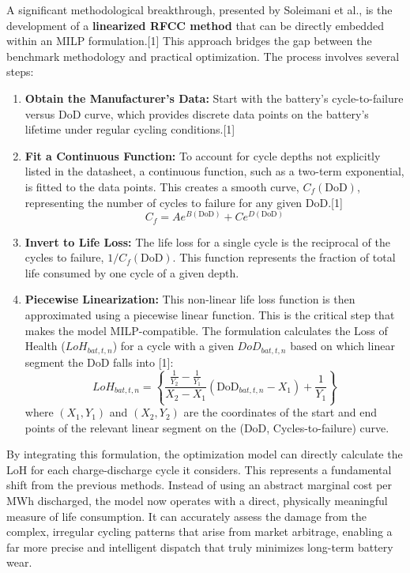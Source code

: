 A significant methodological breakthrough, presented by Soleimani et al., is the development of a \textbf{linearized RFCC method} that can be directly embedded within an MILP formulation.[1] This approach bridges the gap between the benchmark methodology and practical optimization. The process involves several steps:
\begin{enumerate}
    \item \textbf{Obtain the Manufacturer's Data:} Start with the battery's cycle-to-failure versus DoD curve, which provides discrete data points on the battery's lifetime under regular cycling conditions.[1]
    \item \textbf{Fit a Continuous Function:} To account for cycle depths not explicitly listed in the datasheet, a continuous function, such as a two-term exponential, is fitted to the data points. This creates a smooth curve, $C_f(\text{DoD})$, representing the number of cycles to failure for any given DoD.[1]
    \begin{equation}
    C_{f} = A e^{B(\text{DoD})} + C e^{D(\text{DoD})}
    \end{equation}
    \item \textbf{Invert to Life Loss:} The life loss for a single cycle is the reciprocal of the cycles to failure, $1/C_f(\text{DoD})$. This function represents the fraction of total life consumed by one cycle of a given depth.
    \item \textbf{Piecewise Linearization:} This non-linear life loss function is then approximated using a piecewise linear function. This is the critical step that makes the model MILP-compatible. The formulation calculates the Loss of Health ($LoH_{bat,t,n}$) for a cycle with a given $DoD_{bat,t,n}$ based on which linear segment the DoD falls into [1]:
    \begin{equation}
    LoH_{bat,t,n} = \left\{ \frac{\frac{1}{Y_2} - \frac{1}{Y_1}}{X_2 - X_1}(\text{DoD}_{bat,t,n} - X_1) + \frac{1}{Y_1} \right\}
    \end{equation}
    where $(X_1, Y_1)$ and $(X_2, Y_2)$ are the coordinates of the start and end points of the relevant linear segment on the (DoD, Cycles-to-failure) curve.
\end{enumerate}

By integrating this formulation, the optimization model can directly calculate the LoH for each charge-discharge cycle it considers. This represents a fundamental shift from the previous methods. Instead of using an abstract marginal cost per MWh discharged, the model now operates with a direct, physically meaningful measure of life consumption. It can accurately assess the damage from the complex, irregular cycling patterns that arise from market arbitrage, enabling a far more precise and intelligent dispatch that truly minimizes long-term battery wear.

